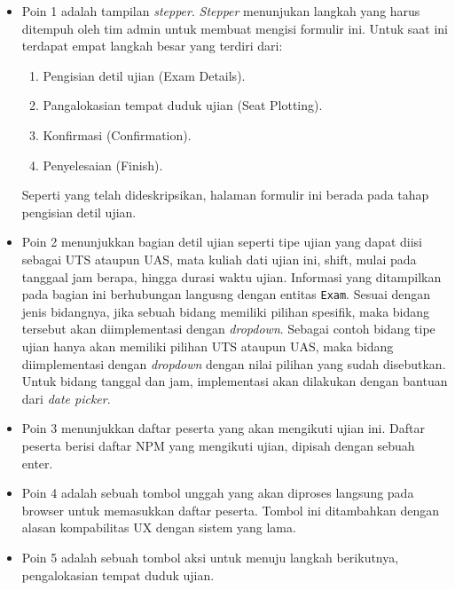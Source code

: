     \begin{itemize}
        \item Poin 1 adalah tampilan \textit{stepper}. \textit{Stepper}
            menunjukan langkah yang harus ditempuh oleh tim admin untuk membuat
            mengisi formulir ini. Untuk saat ini terdapat empat langkah besar
            yang terdiri dari:
                \begin{enumerate}
                    \item Pengisian detil ujian (Exam Details).
                    \item Pangalokasian tempat duduk ujian (Seat Plotting).
                    \item Konfirmasi (Confirmation).
                    \item Penyelesaian (Finish).
                \end{enumerate}
            Seperti yang telah dideskripsikan, halaman formulir ini berada pada
            tahap pengisian detil ujian.
            
        \item Poin 2 menunjukkan bagian detil ujian seperti tipe ujian yang
            dapat diisi sebagai UTS ataupun UAS, mata kuliah dati ujian ini,
            shift, mulai pada tanggaal jam berapa, hingga durasi waktu ujian.
            Informasi yang ditampilkan pada bagian ini berhubungan langusng
            dengan entitas \texttt{Exam}. Sesuai dengan jenis bidangnya, jika
            sebuah bidang memiliki pilihan spesifik, maka bidang tersebut akan
            diimplementasi dengan \textit{dropdown}. Sebagai contoh bidang tipe
            ujian hanya akan memiliki pilihan UTS ataupun UAS, maka bidang
            diimplementasi dengan \textit{dropdown} dengan nilai pilihan yang
            sudah disebutkan. Untuk bidang tanggal dan jam, implementasi akan
            dilakukan dengan bantuan dari \textit{date picker}.
            
        \item Poin 3 menunjukkan daftar peserta yang akan mengikuti ujian ini.
            Daftar peserta berisi daftar NPM yang mengikuti ujian, dipisah
            dengan sebuah enter.
            
        \item Poin 4 adalah sebuah tombol unggah yang akan diproses langsung
            pada browser untuk memasukkan daftar peserta. Tombol ini ditambahkan
            dengan alasan kompabilitas UX dengan sistem yang lama.
            
        \item Poin 5 adalah sebuah tombol aksi untuk menuju langkah berikutnya,
            pengalokasian tempat duduk ujian.
        
    \end{itemize}
    
